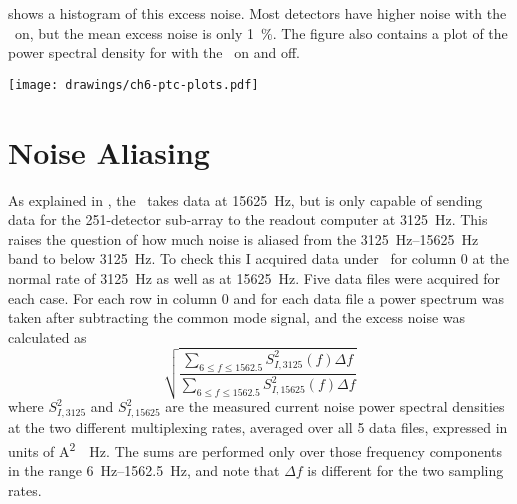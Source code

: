  shows a histogram of this excess noise.
Most detectors have higher noise with the \PTC\ on, but the mean excess noise is only \SI{1}{\percent}.
The figure also contains a plot of the power spectral density for  with the \PTC\ on and off.

\begin{figure*}
  \centering
\texttt{[image: drawings/ch6-ptc-plots.pdf]}
\caption[Plots showing impact of \PTC\ on noise]{
Plots showing impact of \PTC\ on noise.
\textbf{Left}
Histogram showing excess noise due to the \PTC, defined as ratio of total noise above \SI{6}{\Hz} (see text for precise definition).
More detectors have higher noise with the \PTC\ on than off, but the mean excess noise is only \SI{1}{\percent}.
\textbf{Right}
Current noise for  with \PTC\ on and off, after subtracting common mode noise.
The noise below \SI{30}{\Hz} is 1.5--2.5 times higher with the \PTC\ on, but the total noise at the relevant frequencies of $f >= \SI{6}{\Hz}$ is only \SI{2.9}{\percent}.
}
\label{fig:ch6-ptc-plots}
\end{figure*}

\section{Noise Aliasing} \label{sec:ch6-aliasing}

As explained in , the \MCE\ takes data at \SI{15625}{\hertz}, but is only capable of sending data for the 251-detector sub-array to the readout computer at \SI{3125}{\hertz}.
This raises the question of how much noise is aliased from the \SIrange{3125}{15625}{\hertz} band to below \SI{3125}{\hertz}.
To check this I acquired data under \SOC\ for column 0 at the normal rate of \SI{3125}{\hertz} as well as at \SI{15625}{\hertz}.
Five data files were acquired for each case.
For each row in column 0 and for each data file a power spectrum was taken after subtracting the common mode signal, and the excess noise was calculated as
\begin{equation}
  \sqrt{  \frac{ {\displaystyle \sum_{6 \le f \le 1562.5}} S^2_{I,3125}(f) \Delta f }
               { {\displaystyle \sum_{6 \le f \le 1562.5}} S^2_{I,15625}(f) \Delta f }}
\end{equation}
where $S^2_{I,3125}$ and $S^2_{I,15625}$ are the measured current noise power spectral densities at the two different multiplexing rates, averaged over all 5 data files, expressed in units of \si{\A^2 \per \Hz}.
The sums are performed only over those frequency components in the range \SIrange{6}{1562.5}{\Hz}, and note that $\Delta f$ is different for the two sampling rates.

